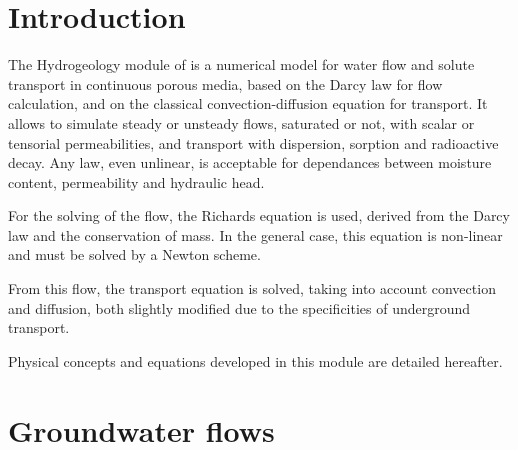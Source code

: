 
%
%
%
%



\section{Introduction}

The Hydrogeology module of \CS is a numerical model for water flow and solute
transport in continuous porous media,
based on the Darcy law for flow calculation, and on the classical
convection-diffusion equation for transport.
It allows to simulate steady or unsteady flows, saturated or not, with scalar or
tensorial permeabilities, and transport with dispersion, sorption and radioactive decay.
Any law, even unlinear, is acceptable for dependances between moisture content,
permeability and hydraulic head.

For the solving of the flow, the Richards equation is used, derived from the Darcy law and the conservation of mass.
In the general case, this equation is non-linear and must be solved by a Newton scheme.

From this flow, the transport equation is solved, taking into account convection and diffusion,
both slightly modified due to the specificities of underground transport.

Physical concepts and equations developed in this module are detailed hereafter.

\section{Groundwater flows}

